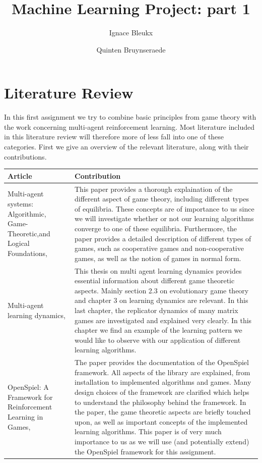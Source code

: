 \documentclass[10pt,a4paper]{article}
\author{Ignace Bleukx \and Quinten Bruynseraede}
\title{Machine Learning Project: part 1}
\begin{document}
\maketitle

\section{Literature Review}
In this first assignment we try to combine basic principles from game theory with the work concerning multi-agent reinforcement learning. Most literature included in this literature review will therefore more of less fall into one of these categories. First we give an overview of the relevant literature, along with their contributions.


\bigskip
\begin{longtable}{|p{4cm}|p{12cm}|}
\hline 
Article & Contribution \\ 
\hline 
\hline
Multi-agent systems: Algorithmic, Game-Theoretic,and Logical Foundations, \citet{mas} & This paper provides a thorough explaination of the different aspect of game theory, including different types of equilibria. These concepts are of importance to us since we will investigate whether or not our learning algorithms converge to one of these equilibria. Furthermore, the paper provides a detailed description of different types of games, such as cooperative games and non-cooperative games, as well as the notion of games in normal form.   \\ 
\hline 
Multi-agent learning dynamics, \citet{phdthesis} &  This thesis on multi agent learning dynamics provides essential information about different game theoretic aspects. Mainly section 2.3 on evolutionary game theory and chapter 3 on learning dynamics are relevant. In this last chapter, the replicator dynamics of many matrix games are investigated and explained very clearly. In this chapter we find an example of the learning pattern we would like to observe with our application of different learning algorithms.   \\
\hline 
OpenSpiel: A Framework for Reinforcement Learning in Games, \citet{lanctot2019openspiel} & The paper provides the documentation of the OpenSpiel framework. All aspects of the library are explained, from installation to implemented algorithms and games. Many design choices of the framework are clarified which helps to understand the philosophy behind the framework. In the paper, the game theoretic aspects are briefly touched upon, as well as important concepts of the implemented learning algorithms. This paper is of very much importance to us as we will use (and potentially extend) the OpenSpiel framework for this assignment. \\ 

\end{longtable}
\end{document}
